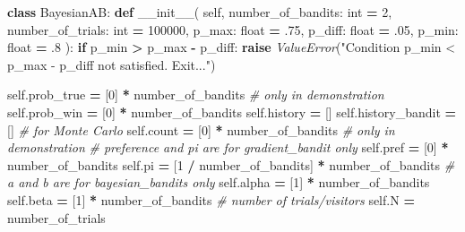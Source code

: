 \documentclass[
]{book}
\newenvironment{Shaded}{\begin{snugshade}}{\end{snugshade}}
\newcommand{\BuiltInTok}[1]{#1}
\newcommand{\CommentTok}[1]{\textcolor[rgb]{0.56,0.35,0.01}{\textit{#1}}}
\newcommand{\ControlFlowTok}[1]{\textcolor[rgb]{0.13,0.29,0.53}{\textbf{#1}}}
\newcommand{\DecValTok}[1]{\textcolor[rgb]{0.00,0.00,0.81}{#1}}
\newcommand{\FloatTok}[1]{\textcolor[rgb]{0.00,0.00,0.81}{#1}}
\newcommand{\FunctionTok}[1]{\textcolor[rgb]{0.00,0.00,0.00}{#1}}
\newcommand{\KeywordTok}[1]{\textcolor[rgb]{0.13,0.29,0.53}{\textbf{#1}}}
\newcommand{\NormalTok}[1]{#1}
\newcommand{\OperatorTok}[1]{\textcolor[rgb]{0.81,0.36,0.00}{\textbf{#1}}}
\newcommand{\PreprocessorTok}[1]{\textcolor[rgb]{0.56,0.35,0.01}{\textit{#1}}}
\newcommand{\StringTok}[1]{\textcolor[rgb]{0.31,0.60,0.02}{#1}}
\newcommand{\VariableTok}[1]{\textcolor[rgb]{0.00,0.00,0.00}{#1}}
\theoremstyle{definition}
\theoremstyle{definition}
\theoremstyle{definition}
\theoremstyle{definition}
\theoremstyle{remark}
\begin{document}
\begin{Shaded}
\begin{Highlighting}[]
\KeywordTok{class}\NormalTok{ BayesianAB:}
    \KeywordTok{def} \FunctionTok{\_\_init\_\_}\NormalTok{(}
            \VariableTok{self}\NormalTok{,}
\NormalTok{            number\_of\_bandits: }\BuiltInTok{int} \OperatorTok{=} \DecValTok{2}\NormalTok{,}
\NormalTok{            number\_of\_trials: }\BuiltInTok{int} \OperatorTok{=} \DecValTok{100000}\NormalTok{,}
\NormalTok{            p\_max: }\BuiltInTok{float} \OperatorTok{=} \FloatTok{.75}\NormalTok{,}
\NormalTok{            p\_diff: }\BuiltInTok{float} \OperatorTok{=} \FloatTok{.05}\NormalTok{,}
\NormalTok{            p\_min: }\BuiltInTok{float} \OperatorTok{=} \FloatTok{.8}
\NormalTok{    ):}
        \ControlFlowTok{if}\NormalTok{ p\_min }\OperatorTok{\textgreater{}}\NormalTok{ p\_max }\OperatorTok{{-}}\NormalTok{ p\_diff:}
            \ControlFlowTok{raise} \PreprocessorTok{ValueError}\NormalTok{(}\StringTok{"Condition p\_min \textless{} p\_max {-} p\_diff not satisfied. Exit..."}\NormalTok{)}

        \VariableTok{self}\NormalTok{.prob\_true }\OperatorTok{=}\NormalTok{ [}\DecValTok{0}\NormalTok{] }\OperatorTok{*}\NormalTok{ number\_of\_bandits  }\CommentTok{\# only in demonstration}
        \VariableTok{self}\NormalTok{.prob\_win }\OperatorTok{=}\NormalTok{ [}\DecValTok{0}\NormalTok{] }\OperatorTok{*}\NormalTok{ number\_of\_bandits}
        \VariableTok{self}\NormalTok{.history }\OperatorTok{=}\NormalTok{ []}
        \VariableTok{self}\NormalTok{.history\_bandit }\OperatorTok{=}\NormalTok{ []  }\CommentTok{\# for Monte Carlo}
        \VariableTok{self}\NormalTok{.count }\OperatorTok{=}\NormalTok{ [}\DecValTok{0}\NormalTok{] }\OperatorTok{*}\NormalTok{ number\_of\_bandits  }\CommentTok{\# only in demonstration}
        \CommentTok{\# preference and pi are for gradient\_bandit only}
        \VariableTok{self}\NormalTok{.pref }\OperatorTok{=}\NormalTok{ [}\DecValTok{0}\NormalTok{] }\OperatorTok{*}\NormalTok{ number\_of\_bandits}
        \VariableTok{self}\NormalTok{.pi }\OperatorTok{=}\NormalTok{ [}\DecValTok{1} \OperatorTok{/}\NormalTok{ number\_of\_bandits] }\OperatorTok{*}\NormalTok{ number\_of\_bandits}
        \CommentTok{\# a and b are for bayesian\_bandits only}
        \VariableTok{self}\NormalTok{.alpha }\OperatorTok{=}\NormalTok{ [}\DecValTok{1}\NormalTok{] }\OperatorTok{*}\NormalTok{ number\_of\_bandits}
        \VariableTok{self}\NormalTok{.beta }\OperatorTok{=}\NormalTok{ [}\DecValTok{1}\NormalTok{] }\OperatorTok{*}\NormalTok{ number\_of\_bandits}
        \CommentTok{\# number of trials/visitors}
        \VariableTok{self}\NormalTok{.N }\OperatorTok{=}\NormalTok{ number\_of\_trials}
\end{Highlighting}
\end{Shaded}
\end{document}

